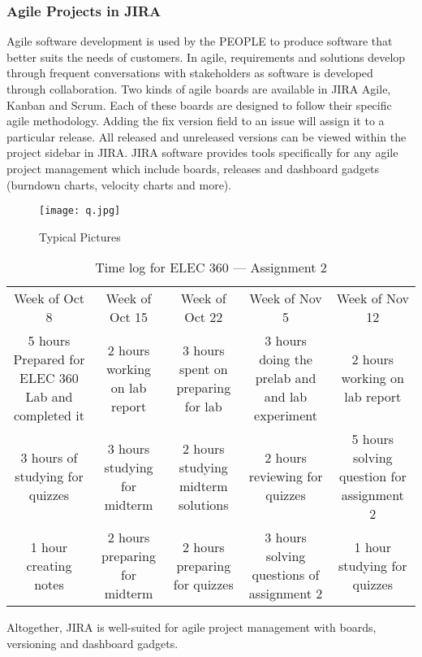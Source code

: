 \subsubsection{Agile Projects in JIRA}
Agile software development is used by the PEOPLE to produce software that better suits the needs of customers. 
In \gls{agile}, requirements and solutions develop through frequent conversations with stakeholders as software is developed through collaboration. Two kinds of agile boards are available in JIRA Agile, Kanban and Scrum. Each of these boards are designed to follow their specific agile methodology. Adding the fix version field to an issue will assign it to a particular release. All released and unreleased versions can be viewed within the project sidebar in JIRA. JIRA software provides tools specifically for any agile project management which include boards, releases and dashboard gadgets (burndown charts, velocity charts and more).

\begin{figure}
	\texttt{[image: q.jpg]}
	\caption{Typical Pictures}
\end{figure}

\begin{table}
	\caption{Time log for ELEC 360 --- Assignment 2}
	\begin{tabular}{c c c c c}
		Week of Oct 8 &                 Week of Oct 15 &                      Week of Oct 22 &                                    Week of Nov 5 &                             Week of Nov 12 \\
		5 hours Prepared for ELEC 360 Lab and completed it &  2 hours working on lab report &  3 hours spent on preparing for lab &  3 hours doing the prelab and and lab experiment &  2 hours working on lab report \\
		3 hours of studying for quizzes &  3 hours studying for midterm &  2 hours studying midterm solutions &  2 hours reviewing for quizzes &  5 hours solving question for assignment 2 \\
		1 hour creating notes &  2 hours preparing for midterm &  2 hours preparing for quizzes &  3 hours solving questions of assignment 2 &  1 hour studying for quizzes \\
	\end{tabular}
\end{table}

Altogether, JIRA is well-suited for \gls{agile} project management with boards, versioning and dashboard gadgets.  

